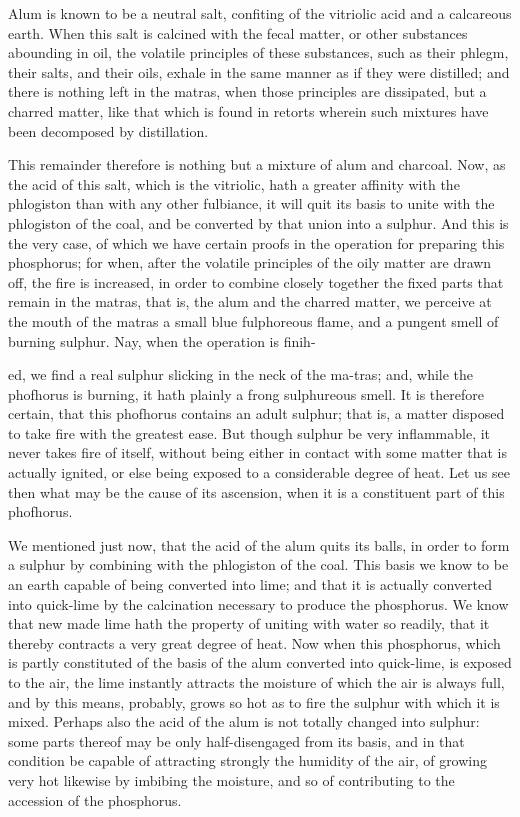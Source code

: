 \documentclass{article}
\begin{document}
Alum is known to be a neutral salt, confiting of the vitriolic acid and a calcareous earth. When this salt is calcined with the fecal matter, or other substances abounding in oil, the volatile principles of these substances, such as their phlegm, their salts, and their oils, exhale in the same manner as if they were distilled; and there is nothing left in the matras, when those principles are dissipated, but a charred matter, like that which is found in retorts wherein such mixtures have been decomposed by distillation.

This remainder therefore is nothing but a mixture of alum and charcoal. Now, as the acid of this salt, which is the vitriolic, hath a greater affinity with the phlogiston than with any other fulbiance, it will quit its basis to unite with the phlogiston of the coal, and be converted by that union into a sulphur. And this is the very case, of which we have certain proofs in the operation for preparing this phosphorus; for when, after the volatile principles of the oily matter are drawn off, the fire is increased, in order to combine closely together the fixed parts that remain in the matras, that is, the alum and the charred matter, we perceive at the mouth of the matras a small blue fulphoreous flame, and a pungent smell of burning sulphur. Nay, when the operation is finih-

ed, we find a real sulphur slicking in the neck of the ma-tras; and, while the phofhorus is burning, it hath plainly a frong sulphureous smell. It is therefore certain, that this phofhorus contains an adult sulphur; that is, a matter disposed to take fire with the greatest ease. But though sulphur be very inflammable, it never takes fire of itself, without being either in contact with some matter that is actually ignited, or else being exposed to a considerable degree of heat. Let us see then what may be the cause of its ascension, when it is a constituent part of this phofhorus.

We mentioned just now, that the acid of the alum quits its balls, in order to form a sulphur by combining with the phlogiston of the coal. This basis we know to be an earth capable of being converted into lime; and that it is actually converted into quick-lime by the calcination necessary to produce the phosphorus. We know that new made lime hath the property of uniting with water so readily, that it thereby contracts a very great degree of heat. Now when this phosphorus, which is partly constituted of the basis of the alum converted into quick-lime, is exposed to the air, the lime instantly attracts the moisture of which the air is always full, and by this means, probably, grows so hot as to fire the sulphur with which it is mixed. Perhaps also the acid of the alum is not totally changed into sulphur: some parts thereof may be only half-disengaged from its basis, and in that condition be capable of attracting strongly the humidity of the air, of growing very hot likewise by imbibing the moisture, and so of contributing to the accession of the phosphorus.
\end{document}

